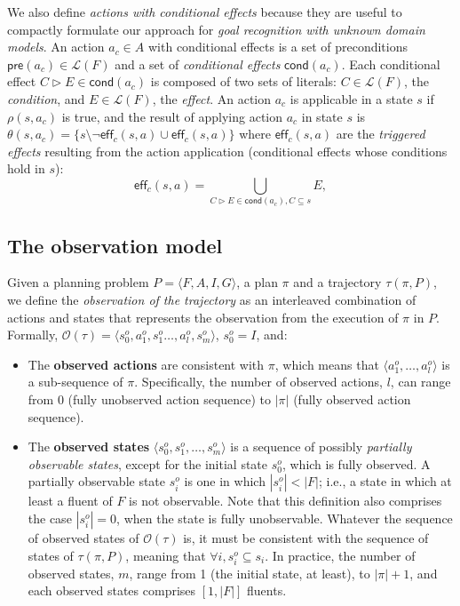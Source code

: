 \documentclass{article}
\newcommand{\tup}[1]{{\langle #1 \rangle}}
\newcommand{\pre}{\mathsf{pre}}     %
\newcommand{\eff}{\mathsf{eff}}     %
\newcommand{\cond}{\mathsf{cond}}   %
\begin{document}
We also define {\em actions with conditional effects} because they are useful to compactly formulate our approach for {\em goal recognition with unknown domain models}. An action $a_c\in A$ with conditional effects is a set of preconditions $\pre(a_c)\in\mathcal{L}(F)$ and a set of {\em conditional effects} $\cond(a_c)$. Each conditional effect $C\rhd E\in\cond(a_c)$ is composed of two sets of literals: $C\in\mathcal{L}(F)$, the {\em condition}, and $E\in\mathcal{L}(F)$, the {\em effect}. An action $a_c$ is applicable in a state $s$ if $\rho(s,a_c)$ is true, and the result of applying action $a_c$ in state $s$ is $\theta(s,a_c)=\{s\setminus\neg\eff_c(s,a)\cup\eff_c(s,a)\}$ where $\eff_c(s,a)$ are the {\em triggered effects} resulting from the action application (conditional effects whose conditions hold in $s$):
\[
\eff_c(s,a)=\bigcup_{C\rhd E\in\cond(a_c),C\subseteq s} E,
\]

\subsection{The observation model}
Given a planning problem $P=\tup{F,A,I,G}$, a plan $\pi$ and a trajectory $\tau(\pi,P)$, we define the \emph{observation of the trajectory} as an interleaved combination of actions and states that represents the observation from the execution of $\pi$ in $P$. Formally, $\mathcal{O}(\tau)=\tup{s_0^o,a_1^o,s_1^o \ldots , a_l^o, s_m^o}$, $s_0^o=I$, and:

\begin{itemize}
\item The {\bf observed actions} are consistent with $\pi$, which means that $\tup{a_1^o, \ldots, a_l^o}$ is a sub-sequence of $\pi$. Specifically, the number of observed actions, $l$, can range from $0$ (fully unobserved action sequence) to $|\pi|$ (fully observed action sequence).
\item The {\bf observed states} $\tup{s_0^o, s_1^o, \ldots, s_m^o}$ is a sequence of possibly {\em partially observable states}, except for the initial state $s_0^o$, which is fully observed. A partially observable state $s_i^o$ is one in which $|s_i^o| < |F|$; i.e., a state in which at least a fluent of $F$ is not observable. Note that this definition also comprises the case $|s_i^o| = 0$, when the state is fully unobservable. Whatever the sequence of observed states of $\mathcal{O}(\tau)$ is, it must be consistent with the sequence of states of $\tau(\pi,P)$, meaning that $\forall i, s_i^o \subseteq s_i$. In practice, the number of observed states, $m$, range from 1 (the initial state, at least), to $|\pi|+1$, and each observed states comprises $[1,|F|]$ fluents.
\end{itemize}
\end{document}

